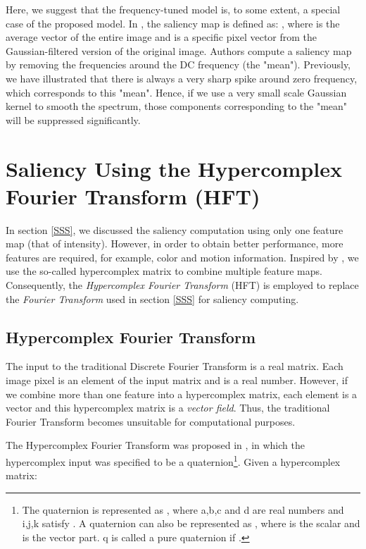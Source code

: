 \documentclass[10pt,journal,cspaper,compsoc]{IEEEtran}
\begin{document}
Here, we suggest that the frequency-tuned model \cite{LCAV-CONF-2009-012} is, to some extent, a special case of the proposed model. In \cite{LCAV-CONF-2009-012}, the saliency map is defined as:
,
where  is the average  vector of the entire image and  is a specific  pixel vector from the Gaussian-filtered version of the original image. Authors compute a saliency map by removing the frequencies around the DC frequency (the {"}mean{"}). Previously, we have illustrated that there is always a very sharp spike around zero frequency, which corresponds to this {"}mean{"}. Hence, if we use a very small scale Gaussian kernel to smooth the spectrum, those components corresponding to the {"}mean{"} will be suppressed significantly.

\section{Saliency Using the  Hypercomplex Fourier Transform (HFT)}
\label{sM:HFT}

In section \ref{SSS}, we discussed the saliency computation using only one feature map (that of intensity). However, in order to obtain better performance, more features are required, for example, color and motion information. Inspired by \cite{guo2008spatio, ell2002quaternion, ell2006hypercomplex}, we use the so-called hypercomplex matrix to combine multiple feature maps. Consequently, the {\it Hypercomplex Fourier Transform} (HFT) is employed to replace the {\it Fourier Transform} used in section \ref{SSS} for saliency computing.

\subsection{Hypercomplex Fourier Transform}

The input to the traditional Discrete Fourier Transform is a real matrix. Each image pixel is an element of the input matrix and is a real number. However, if we combine more than one feature into a hypercomplex matrix, each element is a vector and this hypercomplex matrix is a {\it vector field}. Thus, the traditional Fourier Transform becomes unsuitable for computational purposes.

The Hypercomplex Fourier Transform was proposed in \cite{ell2002quaternion}, in which the hypercomplex input was specified to be a quaternion\footnote{The quaternion is represented as , where a,b,c and d are real numbers and i,j,k satisfy . A quaternion can also be represented as , where  is the scalar and  is the vector part. q is called a pure quaternion if .}.  Given a hypercomplex matrix:
\end{document}
